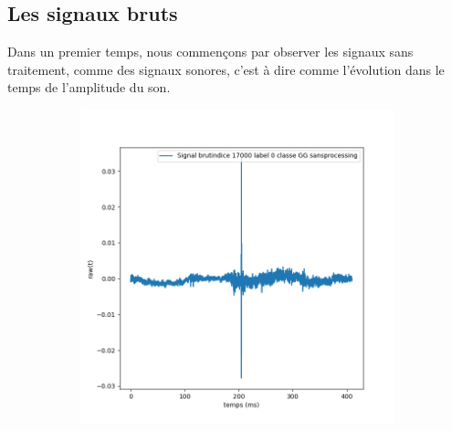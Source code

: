 \hypertarget{Signaux-Bruts}{%
\subsection{Les signaux bruts}
\label{Signaux-Bruts}}

Dans un premier temps, nous commençons par observer les signaux sans traitement, comme des signaux sonores, c'est à dire comme l'évolution dans le temps de l'amplitude du son. 

\begin{figure}[!h]
\centering
	\begin{subfigure}[b]{0.3\textwidth}
    \includegraphics[width=\textwidth]{./images/indice17000Spectro1Dlabel0classeGGsansprocessingsanszoom.png}
    \caption{}
  	\end{subfigure}
  	\begin{subfigure}[b]{0.3\textwidth}

\end{subfigure}
\end{figure}
